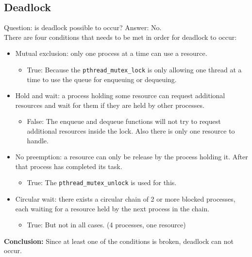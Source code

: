 \documentclass[a4paper,11pt,twoside,fleqn]{article}
\begin{document}
\subsection{Deadlock}

Question: is deadlock possible to occur? Answer: No.
\\
There are four conditions that needs to be met in order for deadlock to occur:
\begin{itemize}

\item
Mutual exclusion: only one process at a time can use a resource.
\begin{itemize} \item True: Because the \verb+pthread_mutex_lock+ is only allowing one thread at a time to use the queue for enqueuing or dequeuing.
\end{itemize}

\item Hold and wait: a process holding some resource can request additional resources and wait for them if they are held by other processes.
\begin{itemize}
\item False: The enqueue and dequeue functions will not try to request additional resources inside the lock. Also there is only one resource to handle.
\end{itemize}

\item No preemption: a resource can only be release by the process holding it. After that process has completed its task.
\begin{itemize}
\item True: The \verb+pthread_mutex_unlock+ is used for this.
\end{itemize} 

\item Circular wait: there exists a circular chain of 2 or more blocked processes, each waiting for a resource held by the next process in the chain.

\begin{itemize}
\item True: But not in all cases. (4 processes, one resource) 
\end{itemize} 
\end{itemize}

\textbf{Conclusion:} Since at least one of the conditions is broken, deadlock can not occur.

\clearpage

\end{document}
